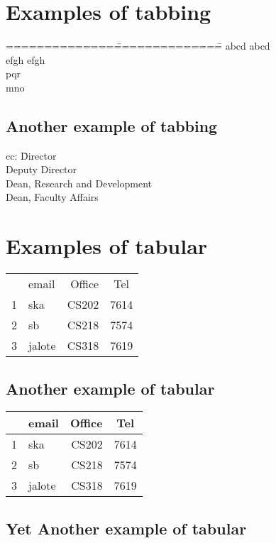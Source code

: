 \documentclass{article}
\begin{document}

\section{Examples of tabbing}

\begin{tabbing}
==============\===============\=\kill
\>abcd \>abcd\\
\>efgh \>efgh\\
\>\>pqr\\
\>mno
\end{tabbing}

\subsection{Another example of tabbing}

\begin{tabbing}
cc: \=Director\\
\>Deputy Director\\
\>Dean, Research and Development\\
\>Dean, Faculty Affairs
\end{tabbing}

\section{Examples of tabular}

\begin{tabular}{rlrc}
  & email & Office & Tel \\
1 & ska & CS202 & 7614\\
2 & sb & CS218 & 7574\\
3 & jalote & CS318 & 7619
\end{tabular}

\subsection{Another example of tabular}

\begin{tabular}{|r|l|r|c|}\hline
  & email & Office & Tel \\\hline
1 & ska & CS202 & 7614\\\hline
2 & sb & CS218 & 7574\\\hline
3 & jalote & CS318 & 7619\\\hline
\end{tabular}

\subsection{Yet Another example of tabular}
\end{document}
